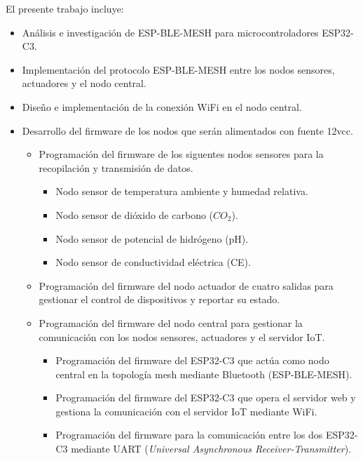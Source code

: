 \documentclass[
11pt, %
codirector, %
]{charter}
\begin{document}
El presente trabajo incluye:
\begin{itemize}
	\item Análisis e investigación de ESP-BLE-MESH para microcontroladores ESP32-C3.
	\item Implementación del protocolo ESP-BLE-MESH entre los nodos sensores, actuadores
	      y el nodo central.
	\item Diseño e implementación de la conexión WiFi en el nodo central.
	\item Desarrollo del firmware de los nodos que serán alimentados con fuente 12vcc.
	      \begin{itemize}
		      \item Programación del firmware de los siguentes nodos sensores para la recopilación
		            y transmisión de datos.
		            \begin{itemize}
			            \item Nodo sensor de temperatura ambiente y humedad relativa.
			            \item Nodo sensor de dióxido de carbono ($CO_2$).
			            \item Nodo sensor de potencial de hidrógeno (pH).
			            \item Nodo sensor de conductividad eléctrica (CE).
		            \end{itemize}
		      \item Programación del firmware del nodo actuador de cuatro salidas para gestionar el
		            control de dispositivos y reportar su estado.
		      \item Programación del firmware del nodo central para gestionar la comunicación con
		            los nodos sensores, actuadores y el servidor IoT.
		            \begin{itemize}
			            \item Programación del firmware del ESP32-C3 que actúa como nodo central en la
			                  topología mesh mediante Bluetooth (ESP-BLE-MESH).
			            \item Programación del firmware del ESP32-C3 que opera el servidor web y gestiona la
			                  comunicación con el servidor IoT mediante WiFi.
			            \item Programación del firmware para la comunicación entre los dos ESP32-C3 mediante
			                  UART (\textit{Universal Asynchronous Receiver-Transmitter}).
		            \end{itemize}
	      \end{itemize}

\end{itemize}
\end{document}
